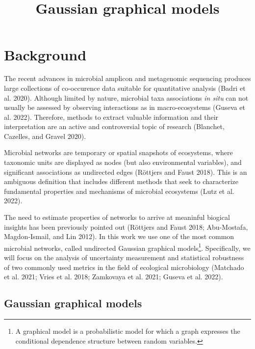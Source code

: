 \documentclass[
  letterpaper,
  DIV=11,
  numbers=noendperiod]{scrartcl}
\title{Gaussian graphical models}
\author{}
\date{}
\begin{document}
\maketitle
\ifdefined\Shaded\renewenvironment{Shaded}{\begin{tcolorbox}[sharp corners, frame hidden, boxrule=0pt, enhanced, borderline west={3pt}{0pt}{shadecolor}, breakable, interior hidden]}{\end{tcolorbox}}\fi

\hypertarget{background}{%
\section{Background}\label{background}}

The recent advances in microbial amplicon and metagenomic sequencing
produces large collections of co-occurence data suitable for
quantitative analysis (Badri et al. 2020). Although limited by nature,
microbial taxa associations \emph{in situ} can not usually be assessed
by observing interactions as in macro-ecosystems (Guseva et al. 2022).
Therefore, methods to extract valuable information and their
interpretation are an active and controversial topic of research
(Blanchet, Cazelles, and Gravel 2020).

Microbial networks are temporary or spatial snapshots of ecosystems,
where taxonomic units are displayed as nodes (but also environmental
variables), and significant associations as undirected edges (Röttjers
and Faust 2018). This is an ambiguous definition that includes different
methods that seek to characterize fundamental properties and mechanisms
of microbial ecosystems (Lutz et al. 2022).

The need to estimate properties of networks to arrive at meaninful
biogical insights has been previously pointed out (Röttjers and Faust
2018; Abu-Mostafa, Magdon-Ismail, and Lin 2012). In this work we use one
of the most common microbial networks, called undirected Gaussian
graphical models\footnote{A graphical model is a probabilistic model for
  which a graph expresses the conditional dependence structure between
  random variables.}. Specifically, we will focus on the analysis of
uncertainty measurement and statistical robustness of two commonly used
metrics in the field of ecological microbiology (Matchado et al. 2021;
Vries et al. 2018; Zamkovaya et al. 2021; Guseva et al. 2022).

\hypertarget{gaussian-graphical-models}{%
\subsection{Gaussian graphical models}\label{gaussian-graphical-models}}
\end{document}
